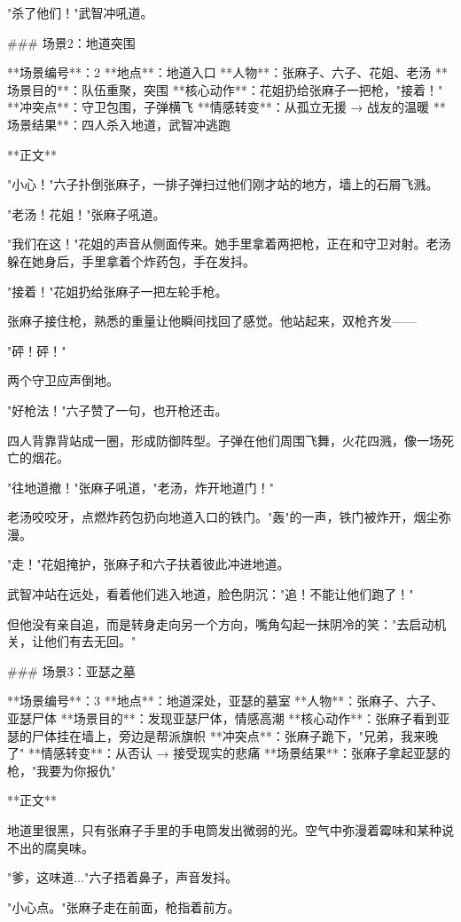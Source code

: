 "杀了他们！"武智冲吼道。

### 场景2：地道突围

**场景编号**：2  
**地点**：地道入口  
**人物**：张麻子、六子、花姐、老汤  
**场景目的**：队伍重聚，突围  
**核心动作**：花姐扔给张麻子一把枪，"接着！"  
**冲突点**：守卫包围，子弹横飞  
**情感转变**：从孤立无援 → 战友的温暖  
**场景结果**：四人杀入地道，武智冲逃跑

**正文**

"小心！"六子扑倒张麻子，一排子弹扫过他们刚才站的地方，墙上的石屑飞溅。

"老汤！花姐！"张麻子吼道。

"我们在这！"花姐的声音从侧面传来。她手里拿着两把枪，正在和守卫对射。老汤躲在她身后，手里拿着个炸药包，手在发抖。

"接着！"花姐扔给张麻子一把左轮手枪。

张麻子接住枪，熟悉的重量让他瞬间找回了感觉。他站起来，双枪齐发——

"砰！砰！"

两个守卫应声倒地。

"好枪法！"六子赞了一句，也开枪还击。

四人背靠背站成一圈，形成防御阵型。子弹在他们周围飞舞，火花四溅，像一场死亡的烟花。

"往地道撤！"张麻子吼道，"老汤，炸开地道门！"

老汤咬咬牙，点燃炸药包扔向地道入口的铁门。"轰"的一声，铁门被炸开，烟尘弥漫。

"走！"花姐掩护，张麻子和六子扶着彼此冲进地道。

武智冲站在远处，看着他们逃入地道，脸色阴沉："追！不能让他们跑了！"

但他没有亲自追，而是转身走向另一个方向，嘴角勾起一抹阴冷的笑："去启动机关，让他们有去无回。"

### 场景3：亚瑟之墓

**场景编号**：3  
**地点**：地道深处，亚瑟的墓室  
**人物**：张麻子、六子、亚瑟尸体  
**场景目的**：发现亚瑟尸体，情感高潮  
**核心动作**：张麻子看到亚瑟的尸体挂在墙上，旁边是帮派旗帜  
**冲突点**：张麻子跪下，"兄弟，我来晚了"  
**情感转变**：从否认 → 接受现实的悲痛  
**场景结果**：张麻子拿起亚瑟的枪，"我要为你报仇"

**正文**

地道里很黑，只有张麻子手里的手电筒发出微弱的光。空气中弥漫着霉味和某种说不出的腐臭味。

"爹，这味道..."六子捂着鼻子，声音发抖。

"小心点。"张麻子走在前面，枪指着前方。

